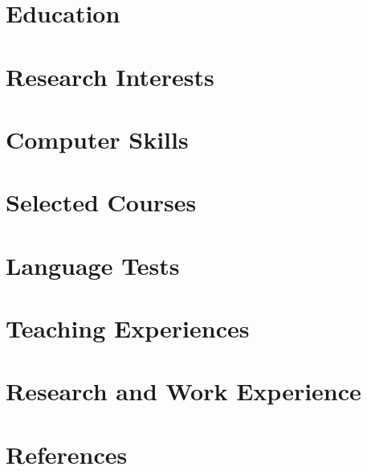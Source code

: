 \documentclass[10pt]{article}
\begin{document}
  \printVersionAndDate
  
  \vspace{-20pt}
  \begin{paracol}{2}
    \section{Education}
      
    \section{Research Interests}
      
    \section{Computer Skills}
      
    \section{Selected Courses}
      
    \section{Language Tests}
    
    \section{Teaching Experiences}
      
    \switchcolumn
%      
    \section{Research and Work Experience}
      
    \section{References}
      
  \end{paracol}
\end{document}
